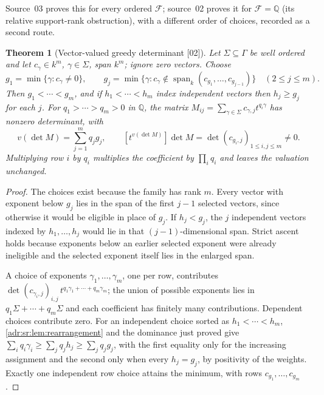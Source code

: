\documentclass[11pt,letterpaper]{article}
\numberwithin{equation}{section}
\newtheorem{theorem}{Theorem}[section]
\theoremstyle{definition}
\theoremstyle{remark}
\newcommand{\Q}{\mathbb Q}
\newcommand{\src}[1]{\textup{[#1]}}%
\begin{document}
Source~03 proves this for every ordered $\mathcal F$; source~02 proves it for
$\mathcal F=\Q$ (its relative support-rank obstruction), with a different
order of choices, recorded as a second route.

\begin{theorem}[Vector-valued greedy determinant \src{02}]
\label{adr:sr:thm:vector}
Let $\Sigma\subseteq\Gamma$ be well ordered and let $c_\gamma\in k^m$,
$\gamma\in\Sigma$, span $k^m$; ignore zero vectors. Choose
\[
 g_1=\min\{\gamma:c_\gamma\ne0\},\qquad
 g_j=\min\{\gamma:c_\gamma\notin\operatorname{span}_k(c_{g_1},\ldots,c_{g_{j-1}})\}
 \quad(2\le j\le m).
\]
Then $g_1<\cdots<g_m$, and if $h_1<\cdots<h_m$ index independent vectors then
$h_j\ge g_j$ for each $j$. For $q_1>\cdots>q_m>0$ in $\Q$, the matrix
$M_{ij}=\sum_{\gamma\in\Sigma}c_{\gamma,j}t^{q_i\gamma}$ has nonzero
determinant, with
\[
 v(\det M)=\sum_{j=1}^mq_jg_j,\qquad
 [t^{v(\det M)}]\det M=\det(c_{g_i,j})_{1\le i,j\le m}\ne0.
\]
Multiplying row $i$ by $q_i$ multiplies the coefficient by $\prod_iq_i$ and
leaves the valuation unchanged.
\end{theorem}
\begin{proof}
The choices exist because the family has rank $m$. Every vector with exponent
below $g_j$ lies in the span of the first $j-1$ selected vectors, since
otherwise it would be eligible in place of $g_j$. If $h_j<g_j$, the $j$
independent vectors indexed by $h_1,\ldots,h_j$ would lie in that
$(j-1)$-dimensional span. Strict ascent holds because exponents below an
earlier selected exponent were already ineligible and the selected exponent
itself lies in the enlarged span.

A choice of exponents $\gamma_1,\ldots,\gamma_m$, one per row, contributes
$\det(c_{\gamma_i,j})_{i,j}\,t^{q_1\gamma_1+\cdots+q_m\gamma_m}$; the union of
possible exponents lies in $q_1\Sigma+\cdots+q_m\Sigma$ and each coefficient
has finitely many contributions. Dependent choices contribute zero. For an
independent choice sorted as $h_1<\cdots<h_m$,
\cref{adr:sr:lem:rearrangement} and the dominance just proved give
$\sum_iq_i\gamma_i\ge\sum_jq_jh_j\ge\sum_jq_jg_j$, with the first equality only
for the increasing assignment and the second only when every $h_j=g_j$, by
positivity of the weights. Exactly one independent row choice attains the
minimum, with rows $c_{g_1},\ldots,c_{g_m}$.
\end{proof}
\end{document}
